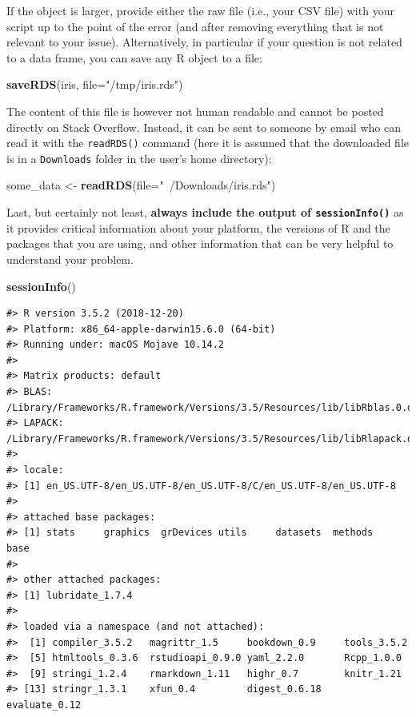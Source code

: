 \documentclass[]{book}
\newenvironment{Shaded}{\begin{snugshade}}{\end{snugshade}}
\newcommand{\KeywordTok}[1]{\textcolor[rgb]{0.13,0.29,0.53}{\textbf{#1}}}
\newcommand{\DataTypeTok}[1]{\textcolor[rgb]{0.13,0.29,0.53}{#1}}
\newcommand{\StringTok}[1]{\textcolor[rgb]{0.31,0.60,0.02}{#1}}
\newcommand{\NormalTok}[1]{#1}
\begin{document}
If the object is larger, provide either the raw file (i.e., your CSV
file) with your script up to the point of the error (and after removing
everything that is not relevant to your issue). Alternatively, in
particular if your question is not related to a data frame, you can save
any R object to a file:

\begin{Shaded}
\begin{Highlighting}[]
\KeywordTok{saveRDS}\NormalTok{(iris, }\DataTypeTok{file=}\StringTok{"/tmp/iris.rds"}\NormalTok{)}
\end{Highlighting}
\end{Shaded}

The content of this file is however not human readable and cannot be
posted directly on Stack Overflow. Instead, it can be sent to someone by
email who can read it with the \texttt{readRDS()} command (here it is
assumed that the downloaded file is in a \texttt{Downloads} folder in
the user's home directory):

\begin{Shaded}
\begin{Highlighting}[]
\NormalTok{some_data <-}\StringTok{ }\KeywordTok{readRDS}\NormalTok{(}\DataTypeTok{file=}\StringTok{"~/Downloads/iris.rds"}\NormalTok{)}
\end{Highlighting}
\end{Shaded}

Last, but certainly not least, \textbf{always include the output of
\texttt{sessionInfo()}} as it provides critical information about your
platform, the versions of R and the packages that you are using, and
other information that can be very helpful to understand your problem.

\begin{Shaded}
\begin{Highlighting}[]
\KeywordTok{sessionInfo}\NormalTok{()}
\end{Highlighting}
\end{Shaded}

\begin{verbatim}
#> R version 3.5.2 (2018-12-20)
#> Platform: x86_64-apple-darwin15.6.0 (64-bit)
#> Running under: macOS Mojave 10.14.2
#> 
#> Matrix products: default
#> BLAS: /Library/Frameworks/R.framework/Versions/3.5/Resources/lib/libRblas.0.dylib
#> LAPACK: /Library/Frameworks/R.framework/Versions/3.5/Resources/lib/libRlapack.dylib
#> 
#> locale:
#> [1] en_US.UTF-8/en_US.UTF-8/en_US.UTF-8/C/en_US.UTF-8/en_US.UTF-8
#> 
#> attached base packages:
#> [1] stats     graphics  grDevices utils     datasets  methods   base     
#> 
#> other attached packages:
#> [1] lubridate_1.7.4
#> 
#> loaded via a namespace (and not attached):
#>  [1] compiler_3.5.2   magrittr_1.5     bookdown_0.9     tools_3.5.2     
#>  [5] htmltools_0.3.6  rstudioapi_0.9.0 yaml_2.2.0       Rcpp_1.0.0      
#>  [9] stringi_1.2.4    rmarkdown_1.11   highr_0.7        knitr_1.21      
#> [13] stringr_1.3.1    xfun_0.4         digest_0.6.18    evaluate_0.12
\end{verbatim}
\end{document}
